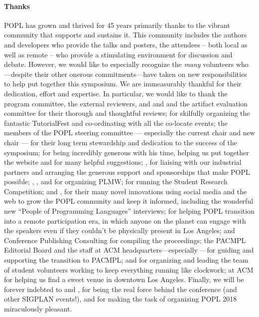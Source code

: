 \documentclass[11pt]{article}
\begin{document}
\paragraph{Thanks}
%
POPL has grown and thrived for 45 years primarily thanks to
the vibrant community that supports and sustains it.
%
This community includes the authors and developers who
provide the talks and posters, the attendees -- both local
as well as remote -- who provide a stimulating environment
for discussion and debate.
%
However, we would like to especially recognize the \emph{many}
volunteers who---despite their other onerous commitments---have
taken on new responsibilities to help put together this symposium.
%
We are immeasurably thankful for their dedication, effort and expertise.
%
In particular, we would like to thank
%
the program committee, the external reviewers,
and  and 
and the artifact evaluation committee for their
thorough and thoughtful reviews;
%
 for skilfully organizing
the fantastic TutorialFest and co-ordinating with
all the co-locate events;
%
the members of the POPL steering committee --- especially the current
chair  and new chair  ---
for their long term stewardship and dedication to the success
of the symposium;
%
 for being incredibly generous with his time,
helping us put together the website and for many helpful
suggestions;
%
, for liaising with our industrial
partners and arranging the generous support and
sponsorships that make POPL possible;
%
, ,
 and 
for organizing PLMW;
%
 for running the Student Research Competition;
%
 and , for their many novel innovations
using social media and the web to grow the POPL community and
keep it informed, including the wonderful new ``People of Programming Languages''
interviews;
%
 for helping POPL transition into a remote participation
era, in which anyone on the planet can engage with the speakers even
if they couldn't be physically present in Los Angeles;
%
%
 and Conference Publishing Consulting
for compiling the proceedings;
%
the PACMPL Editorial Board and the staff at ACM
headquarters---especially ---for guiding
and supporting the transition to PACMPL;
%
 and  for organizing
and leading the team of student volunteers
working to keep everything running like clockwork;
%
 at ACM for helping us find a sweet
venue in downtown Los Angeles.
%
Finally, we will be forever indebted to
 and ,
for being the real force behind the conference
(and other SIGPLAN events!), and for making the
task of organizing POPL 2018 miraculously pleasant.
\end{document}

